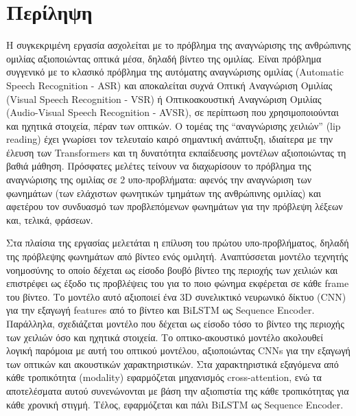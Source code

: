 \vspace*{\fill} %
\section*{Περίληψη}
\label{AbstractGreek}

Η συγκεκριμένη εργασία ασχολείται με το πρόβλημα της αναγνώρισης της ανθρώπινης ομιλίας αξιοποιώντας οπτικά μέσα, δηλαδή βίντεο της ομιλίας. Είναι πρόβλημα συγγενικό με το κλασικό πρόβλημα της αυτόματης αναγνώρισης ομιλίας (Automatic Speech Recognition - ASR) και αποκαλείται συχνά Οπτική Αναγνώριση Ομιλίας (Visual Speech Recognition - VSR) ή Οπτικοακουστική Αναγνώριση Ομιλίας (Audio-Visual Speech Recognition - AVSR), σε περίπτωση που χρησιμοποιούνται και ηχητικά στοιχεία, πέραν των οπτικών. Ο τομέας της ``αναγνώρισης χειλιών'' (lip reading) έχει γνωρίσει τον τελευταίο καιρό σημαντική ανάπτυξη, ιδιαίτερα με την έλευση των Transformers και τη δυνατότητα εκπαίδευσης μοντέλων αξιοποιώντας τη βαθιά μάθηση. Πρόσφατες μελέτες τείνουν να διαχωρίσουν το πρόβλημα της αναγνώρισης της ομιλίας σε 2 υπο-προβλήματα: αφενός την αναγνώριση των φωνημάτων (των ελάχιστων φωνητικών τμημάτων της ανθρώπινης ομιλίας) και αφετέρου τον συνδυασμό των προβλεπόμενων φωνημάτων για την πρόβλεψη λέξεων και, τελικά, φράσεων.

Στα πλαίσια της εργασίας μελετάται η επίλυση του πρώτου υπο-προβλήματος, δηλαδή της πρόβλεψης φωνημάτων από βίντεο ενός ομιλητή. Αναπτύσσεται μοντέλο τεχνητής νοημοσύνης το οποίο δέχεται ως είσοδο βουβό βίντεο της περιοχής των χειλιών και επιστρέφει ως έξοδο τις προβλέψεις του για το ποιο φώνημα εκφέρεται σε κάθε frame του βίντεο. Το μοντέλο αυτό αξιοποιεί ένα 3D συνελικτικό νευρωνικό δίκτυο (CNN) για την εξαγωγή features από το βίντεο και BiLSTM ως Sequence Encoder. Παράλληλα, σχεδιάζεται μοντέλο που δέχεται ως είσοδο τόσο το βίντεο της περιοχής των χειλιών όσο και ηχητικά στοιχεία. Το οπτικο-ακουστικό μοντέλο ακολουθεί λογική παρόμοια με αυτή του οπτικού μοντέλου, αξιοποιώντας CNNs για την εξαγωγή των οπτικών και ακουστικών χαρακτηριστικών. Στα χαρακτηριστικά εξαγόμενα από κάθε τροπικότητα (modality) εφαρμόζεται μηχανισμός cross-attention, ενώ τα αποτελέσματα αυτού συνενώνονται με βάση την αξιοπιστία της κάθε τροπικότητας για κάθε χρονική στιγμή. Τέλος, εφαρμόζεται και πάλι BiLSTM ως Sequence Encoder.

